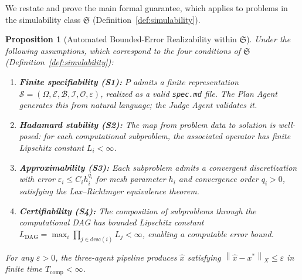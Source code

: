 \documentclass[11pt,a4paper]{article}
\newtheorem{proposition}[definition]{Proposition}
\newcommand{\Sclass}{\mathfrak{S}}
\newcommand{\norm}[1]{\left\|#1\right\|}
\newcommand{\Spec}{\mathcal{S}}
\newcommand{\Domain}{\Omega}
\begin{document}
We restate and prove the main formal guarantee, which applies to problems in the simulability class $\Sclass$ (Definition~\ref{def:simulability}).

\begin{proposition}[Automated Bounded-Error Realizability within $\Sclass$]
\label{prop:bound}
Under the following assumptions, which correspond to the four conditions of $\Sclass$ (Definition~\ref{def:simulability}):
\begin{enumerate}[nosep,label=(A\arabic*)]
\item \textbf{Finite specifiability (S1):} $P$ admits a finite representation $\Spec = (\Domain, \mathcal{E}, \mathcal{B}, \mathcal{I}, \mathcal{O}, \varepsilon)$, realized as a valid \texttt{spec.md} file. The Plan Agent generates this from natural language; the Judge Agent validates it.
\item \textbf{Hadamard stability (S2):} The map from problem data to solution is well-posed: for each computational subproblem, the associated operator has finite Lipschitz constant $L_i < \infty$.
\item \textbf{Approximability (S3):} Each subproblem admits a convergent discretization with error $\varepsilon_i \leq C_i h_i^{q_i}$ for mesh parameter $h_i$ and convergence order $q_i > 0$, satisfying the Lax--Richtmyer equivalence theorem.
\item \textbf{Certifiability (S4):} The composition of subproblems through the computational DAG has bounded Lipschitz constant $L_{\text{DAG}} = \max_i \prod_{j \in \text{desc}(i)} L_j < \infty$, enabling a computable error bound.
\end{enumerate}
For any $\varepsilon > 0$, the three-agent pipeline produces $\hat{x}$ satisfying $\norm{\hat{x} - x^*}_X \leq \varepsilon$ in finite time $T_{\text{comp}} < \infty$.
\end{proposition}
\end{document}
